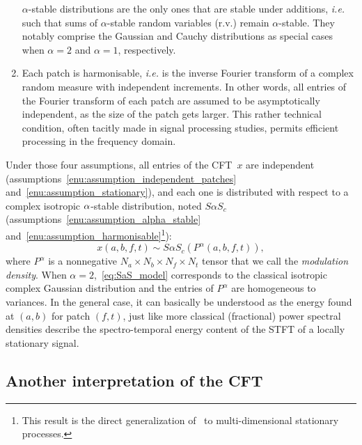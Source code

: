 \begin{enumerate}[leftmargin=0cm,itemindent=.5cm,labelwidth=\itemindent,labelsep=0cm,align=left]
$\alpha$-stable distributions are the only ones that are stable under additions, \emph{i.e.} such that
sums of $\alpha$-stable random variables (r.v.) remain $\alpha$-stable.
They notably comprise the Gaussian and Cauchy distributions as special
cases when $\alpha=2$ and $\alpha=1$, respectively.\label{enu:assumption_alpha_stable}
\item Each patch is harmonisable, \emph{i.e.} is the inverse Fourier
transform of a complex random measure with independent increments.
In other words, all entries of the Fourier transform of each patch
are assumed to be asymptotically independent, as the size of the patch
gets larger. This rather technical condition, often tacitly made in
signal processing studies, permits efficient processing in the frequency
domain.\label{enu:assumption_harmonisable}
\end{enumerate}

Under those four assumptions, all entries of the CFT~$x$ are independent
(assumptions~\ref{enu:assumption_independent_patches} and~\ref{enu:assumption_stationary}),
and each one is distributed with respect to a complex isotropic $\text{\ensuremath{\alpha}}$-stable
distribution, noted $S\alpha S_{c}$ (assumptions~\ref{enu:assumption_alpha_stable}
and~\ref{enu:assumption_harmonisable}\footnote{This result is the direct generalization
of~\cite[th. 6.5.1]{samoradnitsky1994stable} to multi-dimensional stationary processes.}):
\begin{equation}
x\left(a,b,f,t\right)\sim S\alpha S_{c}\left(P^{\alpha}\left(a,b,f,t\right)\right),\label{eq:SaS_model}
\end{equation}
where $P^{\alpha}$ is a nonnegative $N_{a}\times N_{b}\times N_{f}\times N_{t}$
tensor that we call the \emph{modulation density}. When $\alpha=2$,~\eqref{eq:SaS_model}
corresponds to the classical isotropic complex Gaussian distribution
and the entries of $P^{\alpha}$ are homogeneous to variances. In
the general case, it can basically be understood as the energy found at $\left(a,b\right)$ for patch
$\left(f,t\right)$, just like more classical (fractional) power spectral
densities describe the spectro-temporal energy content of the STFT
of a locally stationary signal.

\subsection{Another interpretation of the CFT}

\label{sub:interpretation}

